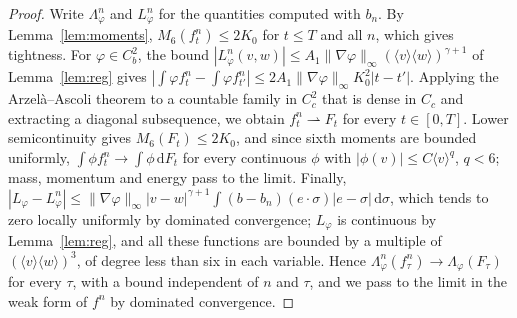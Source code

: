 \documentclass[11pt]{amsart}
\theoremstyle{definition}
\newcommand{\dd}{\,\mathrm{d}}
\newcommand{\jb}[1]{\langle #1\rangle}
\begin{document}
\begin{proof}
Write $\Lambda^n_\varphi$ and $L^n_\varphi$ for the quantities computed with $b_n$. By Lemma~\ref{lem:moments}, $M_6(f^n_t)\le2K_0$ for $t\le T$ and all $n$, which gives tightness. For $\varphi\in C^2_b$, the bound $|L^n_\varphi(v,w)|\le A_1\|\nabla\varphi\|_\infty(\jb{v}\jb{w})^{\gamma+1}$ of Lemma~\ref{lem:reg} gives $|\int\varphi f^n_t-\int\varphi f^n_{t'}|\le2A_1\|\nabla\varphi\|_\infty K_0^2|t-t'|$. Applying the Arzel\`a--Ascoli theorem to a countable family in $C^2_c$ that is dense in $C_c$ and extracting a diagonal subsequence, we obtain $f^n_t\rightharpoonup F_t$ for every $t\in[0,T]$. Lower semicontinuity gives $M_6(F_t)\le2K_0$, and since sixth moments are bounded uniformly, $\int\phi f^n_t\to\int\phi\dd F_t$ for every continuous $\phi$ with $|\phi(v)|\le C\jb{v}^q$, $q<6$; mass, momentum and energy pass to the limit. Finally, $|L_\varphi-L^n_\varphi|\le\|\nabla\varphi\|_\infty|v-w|^{\gamma+1}\int(b-b_n)(e\cdot\sigma)|e-\sigma|\dd\sigma$, which tends to zero locally uniformly by dominated convergence; $L_\varphi$ is continuous by Lemma~\ref{lem:reg}, and all these functions are bounded by a multiple of $(\jb{v}\jb{w})^{3}$, of degree less than six in each variable. Hence $\Lambda^n_\varphi(f^n_\tau)\to\Lambda_\varphi(F_\tau)$ for every $\tau$, with a bound independent of $n$ and $\tau$, and we pass to the limit in the weak form of $f^n$ by dominated convergence.
\end{proof}
\end{document}

